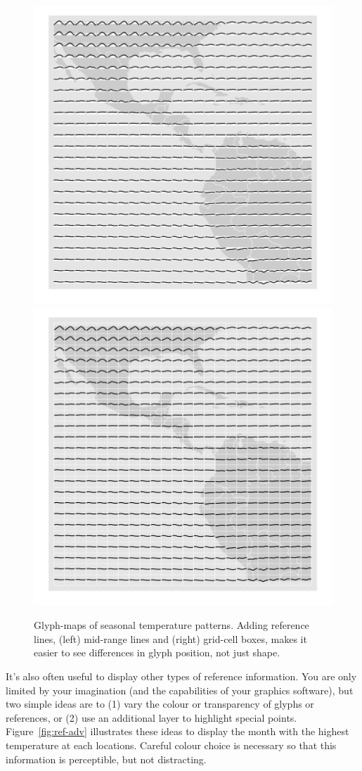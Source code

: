 \documentclass[oneside]{article}
\begin{document}
\begin{figure}[htbp]
  \centering
  \includegraphics[width=0.5\linewidth]{ref-line}%
  \includegraphics[width=0.5\linewidth]{ref-box}

  \caption{Glyph-maps of seasonal temperature patterns. Adding reference lines, (left) mid-range lines and (right) grid-cell boxes, makes it easier to see differences in glyph position, not just shape.}
  \label{fig:ref-basic}
\end{figure}

It's also often useful to display other types of reference information. You are only limited by your imagination (and the capabilities of your graphics software), but two simple ideas are to (1) vary the colour or transparency of glyphs or references, or (2) use an additional layer to highlight special points. Figure~\ref{fig:ref-adv} illustrates these ideas to display the month with the highest temperature at each locations. Careful colour choice is necessary so that this information is perceptible, but not distracting.
\end{document}
